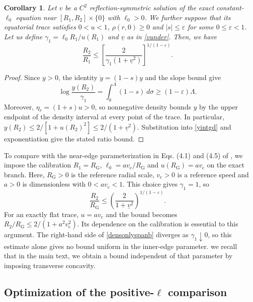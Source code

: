 \documentclass[amsmath,amsfonts,amssymb,aps,pra,superscriptaddress,10pt]{revtex4-2}
\numberwithin{equation}{section}
\theoremstyle{plain}
\newtheorem{corollary}{Corollary}
\theoremstyle{definition}
\theoremstyle{remark}
\theoremstyle{definition}
\newcommand{\ellzero}{\ell_0}
\newcommand{\RG}{R_{\mathrm G}}
\newcommand{\vc}{v_{\mathrm c}}
\begin{document}
\begin{corollary}
Let $v$ be a $C^2$ reflection-symmetric solution of the exact constant-$\ellzero$ equation near $[R_1,R_2]\times\{0\}$ with $\ellzero>0$. We further suppose that its equatorial trace satisfies $0<u<1$, $\rho(r,0)\geq 0$ and $|s|\leq\varepsilon$ for some $0\leq\varepsilon<1$. Let us define $\gamma_1=\ellzero R_1/u(R_1)$ and 
$\underline{v}$ as in \eqref{vunder}. Then, we have
\begin{equation}\label{densonlyspanb}
\frac{R_2}{R_1}\leq\left[\frac{2}{\gamma_1(1+\underline{v}^2)}\right]^{1/(1-\varepsilon)}.
\end{equation}
\end{corollary}

\begin{proof}
Since $y>0$, the identity $\dot{y}=(1-s)y$ and the slope bound give
\begin{equation}\label{yintgd}
\log{\frac{y(R_2)}{\gamma_1}}=\int_0^\Lambda(1-s)~d\sigma\geq (1-\varepsilon)\Lambda.
\end{equation}
Moreover, $\eta_r=(1+s)u>0$, so nonnegative density bounds $y$ by the upper endpoint of the density interval at every point of the trace. In particular, $y(R_2)\leq 2/[1+u(R_2)^2]\leq 2/(1+\underline{v}^2)$. Substitution into \eqref{yintgd} and exponentiation give the stated ratio bound.
\end{proof}

To compare with the near-edge parameterization in Eqs. (4.1) and (4.5) of \cite{Astesiano2022EPJC}, we impose the calibration $R_1=\RG$, $\ellzero=a\vc/\RG$ and $u(\RG)=a\vc$ on the exact branch. Here, $\RG>0$ is the reference radial scale, $\vc>0$ is a reference speed and $a>0$ is dimensionless with $0<a\vc<1$. This choice gives $\gamma_1=1$, so
\begin{equation}
\frac{R_2}{\RG}\leq\left(\frac{2}{1+\underline{v}^2}\right)^{1/(1-\varepsilon)}.
\end{equation}
For an exactly flat trace, $u=a\vc$ and the bound becomes $R_2/\RG\leq 2/(1+a^2\vc^2)$. Its dependence on the calibration is essential to this argument. The right-hand side of \eqref{densonlyspanb} diverges as $\gamma_1\downarrow 0$, so this estimate alone gives no bound uniform in the inner-edge parameter. we recall that in the main text, we obtain a bound independent of that parameter by imposing transverse concavity.

\subsection{Optimization of the positive-\texorpdfstring{$\ell$}{ell} comparison}
\end{document}
